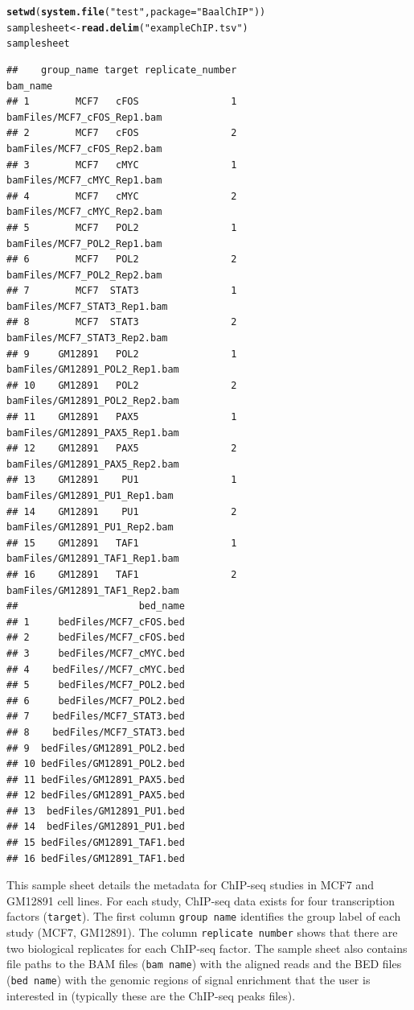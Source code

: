 \documentclass{article}\usepackage[]{graphicx}\usepackage[usenames,dvipsnames]{color}
\makeatletter
\newcommand{\hlstr}[1]{\textcolor[rgb]{0.192,0.494,0.8}{#1}}%
\newcommand{\hlstd}[1]{\textcolor[rgb]{0.345,0.345,0.345}{#1}}%
\newcommand{\hlkwb}[1]{\textcolor[rgb]{0.69,0.353,0.396}{#1}}%
\newcommand{\hlkwc}[1]{\textcolor[rgb]{0.333,0.667,0.333}{#1}}%
\newcommand{\hlkwd}[1]{\textcolor[rgb]{0.737,0.353,0.396}{\textbf{#1}}}%
\newenvironment{kframe}{%
 \def\at@end@of@kframe{}%
 \ifinner\ifhmode%
  \def\at@end@of@kframe{\end{minipage}}%
  \begin{minipage}{\columnwidth}%
 \fi\fi%
 \def\FrameCommand##1{\hskip\@totalleftmargin \hskip-\fboxsep
 \colorbox{shadecolor}{##1}\hskip-\fboxsep
     \hskip-\linewidth \hskip-\@totalleftmargin \hskip\columnwidth}%
 \MakeFramed {\advance\hsize-\width
   \@totalleftmargin\z@ \linewidth\hsize
   \@setminipage}}%
 {\par\unskip\endMakeFramed%
 \at@end@of@kframe}
\newenvironment{knitrout}{}{} %
\makeatother
\begin{document}
\begin{knitrout}
\color{fgcolor}\begin{kframe}
\begin{alltt}
\hlkwd{setwd}\hlstd{(}\hlkwd{system.file}\hlstd{(}\hlstr{"test"}\hlstd{,}\hlkwc{package}\hlstd{=}\hlstr{"BaalChIP"}\hlstd{))}
\hlstd{samplesheet} \hlkwb{<-} \hlkwd{read.delim}\hlstd{(}\hlstr{"exampleChIP.tsv"}\hlstd{)}
\hlstd{samplesheet}
\end{alltt}
\begin{verbatim}
##    group_name target replicate_number                       bam_name
## 1        MCF7   cFOS                1    bamFiles/MCF7_cFOS_Rep1.bam
## 2        MCF7   cFOS                2    bamFiles/MCF7_cFOS_Rep2.bam
## 3        MCF7   cMYC                1    bamFiles/MCF7_cMYC_Rep1.bam
## 4        MCF7   cMYC                2    bamFiles/MCF7_cMYC_Rep2.bam
## 5        MCF7   POL2                1    bamFiles/MCF7_POL2_Rep1.bam
## 6        MCF7   POL2                2    bamFiles/MCF7_POL2_Rep2.bam
## 7        MCF7  STAT3                1   bamFiles/MCF7_STAT3_Rep1.bam
## 8        MCF7  STAT3                2   bamFiles/MCF7_STAT3_Rep2.bam
## 9     GM12891   POL2                1 bamFiles/GM12891_POL2_Rep1.bam
## 10    GM12891   POL2                2 bamFiles/GM12891_POL2_Rep2.bam
## 11    GM12891   PAX5                1 bamFiles/GM12891_PAX5_Rep1.bam
## 12    GM12891   PAX5                2 bamFiles/GM12891_PAX5_Rep2.bam
## 13    GM12891    PU1                1  bamFiles/GM12891_PU1_Rep1.bam
## 14    GM12891    PU1                2  bamFiles/GM12891_PU1_Rep2.bam
## 15    GM12891   TAF1                1 bamFiles/GM12891_TAF1_Rep1.bam
## 16    GM12891   TAF1                2 bamFiles/GM12891_TAF1_Rep2.bam
##                     bed_name
## 1     bedFiles/MCF7_cFOS.bed
## 2     bedFiles/MCF7_cFOS.bed
## 3     bedFiles/MCF7_cMYC.bed
## 4    bedFiles//MCF7_cMYC.bed
## 5     bedFiles/MCF7_POL2.bed
## 6     bedFiles/MCF7_POL2.bed
## 7    bedFiles/MCF7_STAT3.bed
## 8    bedFiles/MCF7_STAT3.bed
## 9  bedFiles/GM12891_POL2.bed
## 10 bedFiles/GM12891_POL2.bed
## 11 bedFiles/GM12891_PAX5.bed
## 12 bedFiles/GM12891_PAX5.bed
## 13  bedFiles/GM12891_PU1.bed
## 14  bedFiles/GM12891_PU1.bed
## 15 bedFiles/GM12891_TAF1.bed
## 16 bedFiles/GM12891_TAF1.bed
\end{verbatim}
\end{kframe}
\end{knitrout}

This sample sheet details the metadata for ChIP-seq studies in MCF7 and GM12891 cell lines. For each study, ChIP-seq data exists for four transcription factors (\texttt{target}). The first column \texttt{group name} identifies the group label of each study (MCF7, GM12891). The column \texttt{replicate number} shows that there are two biological replicates for each ChIP-seq factor. The sample sheet also contains file paths to the BAM files (\texttt{bam name}) with the aligned reads and the BED files (\texttt{bed name}) with  the genomic regions of signal enrichment that the user is interested in (typically these are the ChIP-seq peaks files).   
\end{document}
